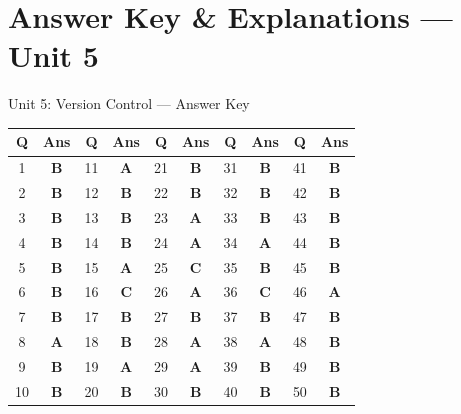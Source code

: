 \newpage
\section{Answer Key \& Explanations --- Unit 5}

\begin{answerkeytable}{Unit 5: Version Control --- Answer Key}
\begin{tabular}{*{10}{c}}
\toprule
\textbf{Q} & \textbf{Ans} & \textbf{Q} & \textbf{Ans} & \textbf{Q} & \textbf{Ans} & \textbf{Q} & \textbf{Ans} & \textbf{Q} & \textbf{Ans} \\
\midrule
1 & \textbf{B} & 11 & \textbf{A} & 21 & \textbf{B} & 31 & \textbf{B} & 41 & \textbf{B} \\
2 & \textbf{B} & 12 & \textbf{B} & 22 & \textbf{B} & 32 & \textbf{B} & 42 & \textbf{B} \\
3 & \textbf{B} & 13 & \textbf{B} & 23 & \textbf{A} & 33 & \textbf{B} & 43 & \textbf{B} \\
4 & \textbf{B} & 14 & \textbf{B} & 24 & \textbf{A} & 34 & \textbf{A} & 44 & \textbf{B} \\
5 & \textbf{B} & 15 & \textbf{A} & 25 & \textbf{C} & 35 & \textbf{B} & 45 & \textbf{B} \\
6 & \textbf{B} & 16 & \textbf{C} & 26 & \textbf{A} & 36 & \textbf{C} & 46 & \textbf{A} \\
7 & \textbf{B} & 17 & \textbf{B} & 27 & \textbf{B} & 37 & \textbf{B} & 47 & \textbf{B} \\
8 & \textbf{A} & 18 & \textbf{B} & 28 & \textbf{A} & 38 & \textbf{A} & 48 & \textbf{B} \\
9 & \textbf{B} & 19 & \textbf{A} & 29 & \textbf{A} & 39 & \textbf{B} & 49 & \textbf{B} \\
10 & \textbf{B} & 20 & \textbf{B} & 30 & \textbf{B} & 40 & \textbf{B} & 50 & \textbf{B} \\
\bottomrule
\end{tabular}
\end{answerkeytable}

